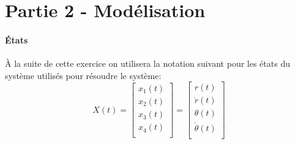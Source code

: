 \documentclass[class=article, crop=false]{standalone}
\begin{document}
\section{Partie 2 - Modélisation}
\paragraph{États}À la suite de cette exercice on utilisera la notation suivant pour les états du système utilisés pour résoudre le système:
\begin{equation}\label{eq:def_states}
    X(t) =
    \begin{bmatrix}
        x_1(t)\\
        x_2(t)\\
        x_3(t)\\
        x_4(t)\\
    \end{bmatrix}
    =
    \begin{bmatrix}
        r(t)\\
        \dot{r}(t)\\
        \theta(t)\\
        \dot{\theta}(t)\\
    \end{bmatrix}
\end{equation}
\end{document}
